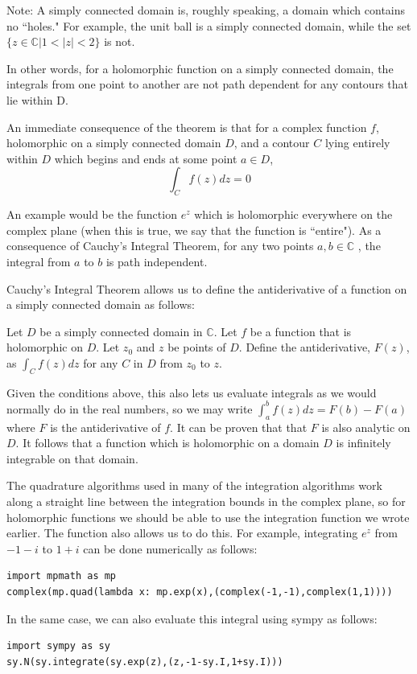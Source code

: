 Note: A simply connected domain is, roughly speaking, a domain which contains no ``holes." For example, the unit ball is a simply connected domain, while the set $\lbrace z\in \mathbb{C} | 1<|z|<2 \rbrace$ is not. 

In other words, for a holomorphic function on a simply connected domain, the integrals from one point to another are not path dependent for any contours that lie within D.

An immediate consequence of the theorem is that for a complex function $f$, holomorphic on a simply connected domain $D$, and a contour $C$ lying entirely within $D$ which begins and ends at some point $a\in D$, $$\int_C f(z)dz=0$$

An example would be the function $e^z$ which is holomorphic everywhere on the complex plane (when this is true, we say that the function is ``entire"). As a consequence of Cauchy's Integral Theorem, for any two points $a,b\in \mathbb{C}$ , the integral from $a$ to $b$ is path independent.

Cauchy's Integral Theorem allows us to define the antiderivative of a function on a simply connected domain as follows:

Let $D$ be a simply connected domain in $\mathbb{C}$. Let $f$ be a function that is holomorphic on $D$. Let $z_0$ and $z$ be points of $D$. Define the antiderivative, $F(z)$, as $\int_C f(z)dz$ for any $C$ in $D$ from $z_0$ to $z$.

Given the conditions above, this also lets us evaluate integrals as we would normally do in the real numbers, so we may write $\int_a^b f(z)dz=F(b)-F(a)$ where $F$ is the antiderivative of $f$. It can be proven that that $F$ is also analytic on $D$. It follows that a function which is holomorphic on a domain $D$ is infinitely integrable on that domain.

The quadrature algorithms used in many of the integration algorithms work along a straight line between the integration bounds in the complex plane, so for holomorphic functions we should be able to use the integration function we wrote earlier. The  function also allows us to do this. For example, integrating $e^z$ from $-1-i$ to $1+i$ can be done numerically as follows:
\begin{lstlisting}[style=python]
import mpmath as mp
complex(mp.quad(lambda x: mp.exp(x),(complex(-1,-1),complex(1,1))))
\end{lstlisting}

In the same case, we can also evaluate this integral using sympy as follows:
\begin{lstlisting}[style=python]
import sympy as sy
sy.N(sy.integrate(sy.exp(z),(z,-1-sy.I,1+sy.I)))
\end{lstlisting}

